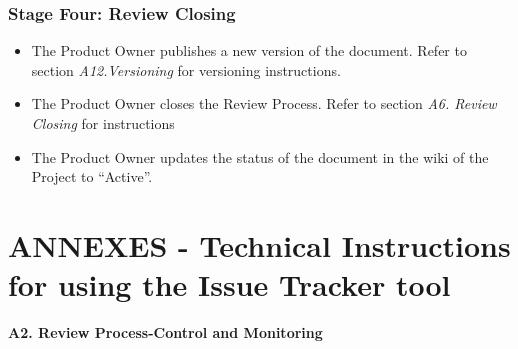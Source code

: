 \documentclass{template/openetcs_article}
\begin{document}
\subsubsection{Stage Four: Review Closing}

\begin{itemize}
\item The Product Owner publishes a new version of the document. Refer to section {\it A12.Versioning} for versioning instructions.
\item The Product Owner closes the Review Process. Refer to section {\it A6. Review Closing} for instructions 
\item The Product Owner updates the status of the document in the wiki of the Project to “Active”.
\end{itemize}

\section{ANNEXES - Technical Instructions for using the Issue Tracker tool}

\textbf{A2. Review Process-Control and Monitoring}
\end{document}
